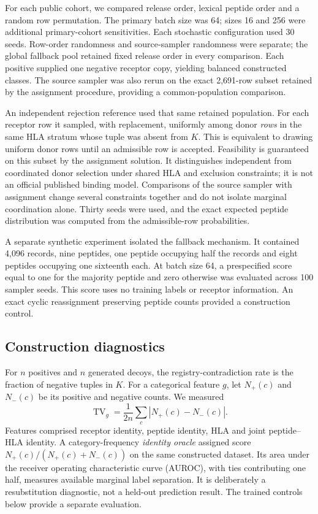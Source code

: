 \documentclass[pdflatex,sn-basic]{sn-jnl}
\newcommand{\TV}{\operatorname{TV}}
\begin{document}
For each public cohort, we compared release order, lexical peptide order and a random row permutation. The primary batch size was 64; sizes 16 and 256 were additional primary-cohort sensitivities. Each stochastic configuration used 30 seeds. Row-order randomness and source-sampler randomness were separate; the global fallback pool retained fixed release order in every comparison. Each positive supplied one negative receptor copy, yielding balanced constructed classes. The source sampler was also rerun on the exact 2,691-row subset retained by the assignment procedure, providing a common-population comparison.

An independent rejection reference used that same retained population. For each receptor row it sampled, with replacement, uniformly among donor \emph{rows} in the same HLA stratum whose tuple was absent from $K$. This is equivalent to drawing uniform donor rows until an admissible row is accepted. Feasibility is guaranteed on this subset by the assignment solution. It distinguishes independent from coordinated donor selection under shared HLA and exclusion constraints; it is not an official published binding model. Comparisons of the source sampler with assignment change several constraints together and do not isolate marginal coordination alone. Thirty seeds were used, and the exact expected peptide distribution was computed from the admissible-row probabilities.

A separate synthetic experiment isolated the fallback mechanism. It contained 4,096 records, nine peptides, one peptide occupying half the records and eight peptides occupying one sixteenth each. At batch size 64, a prespecified score equal to one for the majority peptide and zero otherwise was evaluated across 100 sampler seeds. This score uses no training labels or receptor information. An exact cyclic reassignment preserving peptide counts provided a construction control.

\subsection{Construction diagnostics}
For $n$ positives and $n$ generated decoys, the registry-contradiction rate is the fraction of negative tuples in $K$. For a categorical feature $g$, let $N_+(c)$ and $N_-(c)$ be its positive and negative counts. We measured
\begin{equation}
\TV_g=\frac{1}{2n}\sum_c\left|N_+(c)-N_-(c)\right|.
\label{eq:tv}
\end{equation}
Features comprised receptor identity, peptide identity, HLA and joint peptide--HLA identity. A category-frequency \emph{identity oracle} assigned score $N_+(c)/(N_+(c)+N_-(c))$ on the same constructed dataset. Its area under the receiver operating characteristic curve (AUROC), with ties contributing one half, measures available marginal label separation. It is deliberately a resubstitution diagnostic, not a held-out prediction result. The trained controls below provide a separate evaluation.
\end{document}
